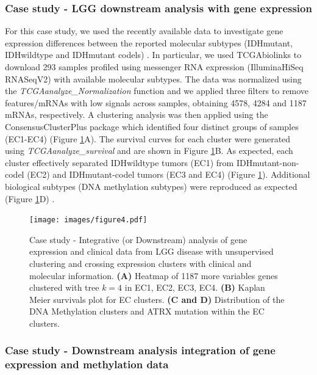 \subsubsection*{Case study - LGG downstream analysis with gene expression}

For this case study, we used the recently available  data to investigate gene expression differences between the reported molecular subtypes (IDHmutant, IDHwildtype and IDHmutant codels) \cite{platforms2015comprehensive}. In particular, we used TCGAbiolinks to download 293 samples profiled using messenger RNA expression (IlluminaHiSeq RNASeqV2) with available molecular subtypes. The data was normalized using the \textit{TCGAanalyze\_Normalization} function and we applied three filters to remove features/mRNAs with low signals across samples, obtaining 4578, 4284 and 1187 mRNAs, respectively. A clustering analysis was then applied using the ConsensusClusterPlus package \cite{wilkerson2010consensusclusterplus} which identified four distinct groups of samples (EC1-EC4) (Figure \ref{fig:caseexp}A). The survival curves for each cluster were generated using \textit{TCGAanalyze\_survival} and are shown in Figure \ref{fig:caseexp}B. As expected, each cluster effectively separated IDHwildtype tumors (EC1) from IDHmutant-non-codel (EC2) and IDHmutant-codel tumors (EC3 and EC4) (Figure \ref{fig:caseexp}). Additional biological subtypes (DNA methylation subtypes) were reproduced as expected (Figure \ref{fig:caseexp}D) \cite{platforms2015comprehensive}.

\begin{figure}
\centering
\texttt{[image: images/figure4.pdf]}
\caption[Case study - LGG downstream analysis with gene expression]{Case study - Integrative (or Downstream) analysis of gene expression and clinical data from LGG disease with unsupervised clustering and crossing expression clusters with clinical and molecular information. \textbf{(A)} Heatmap of 1187 more variables genes clustered with tree $k = 4$ in EC1, EC2, EC3, EC4. \textbf{(B)} Kaplan Meier survivals plot for EC clusters. \textbf{(C and D)} Distribution of the DNA Methylation clusters and ATRX mutation within the EC clusters.}
\label{fig:caseexp}
\end{figure}

\subsubsection*{Case study - Downstream analysis integration of gene expression and methylation data}


